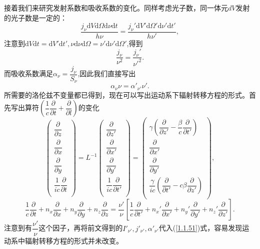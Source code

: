 \documentclass[../天体物理基础.tex]{subfiles}
\begin{document}
接着我们来研究发射系数和吸收系数的变化。同样考虑光子数，同一体元$dV$发射的光子数是一定的：
\begin{equation}
\frac{j_\nu\mathrm{d}V\mathrm{d}\Omega\mathrm{d}\nu\mathrm{d}t}{h\nu}=\frac{j_\nu'\mathrm{d}V'\mathrm{d}\Omega'\mathrm{d}\nu'\mathrm{d}t'}{h\nu'},
\end{equation}
注意到$\mathrm{d}V\mathrm{d}t=\mathrm{d}V'\mathrm{d}t',\nu\mathrm{d}\nu\mathrm{d}\Omega=\nu'\mathrm{d}\nu'\mathrm{d}\Omega'$,得到
\begin{equation}
\frac{j_\nu}{\nu^2}=\frac{j_\nu'}{\nu'^2}.
\end{equation}
而吸收系数满足$\alpha_{\nu}=\dfrac{j_{\nu}}{S_{\nu}}$,因此我们直接写出
\begin{equation}
\alpha_{\nu}\nu=\alpha'_{\nu'}\nu'.
\end{equation}
所需要的洛伦兹不变量都已得到，现在可以写出运动系下辐射转移方程的形式。首先写出算符$\left(\dfrac{1}{c}\dfrac{\partial{}}{\partial{}t}+\dfrac{\partial{}}{\partial{}l}\right)$的变化
\begin{equation}
\begin{pmatrix}
\dfrac{\partial}{\partial z}\\
\dfrac{\partial}{\partial x}\\
\dfrac{\partial}{\partial y}\\
\dfrac1{ic}\dfrac{\partial}{\partial t}\\
\end{pmatrix}
=L^{-1}
\begin{pmatrix}
\dfrac{\partial}{\partial z'}\\
\dfrac{\partial}{\partial x'}\\
\dfrac{\partial}{\partial y'}\\
\dfrac1{ic}\dfrac{\partial}{\partial t'}\\
\end{pmatrix}
=\begin{pmatrix}
\gamma(\dfrac{\partial}{\partial z'}-\dfrac{\beta}c\dfrac{\partial}{\partial t'})\\
\dfrac{\partial}{\partial x'}\\
\dfrac{\partial}{\partial y'}\\
\dfrac\gamma{ic}(\dfrac{\partial}{\partial t'}-c\beta\dfrac{\partial}{\partial z'})\\
\end{pmatrix},
\end{equation}
\begin{equation}
\frac1c\frac{\partial }{\partial t}+n_{x}\frac{\partial}{\partial x}+n_{y}\frac{\partial}{\partial y}+n_{z}\frac{\partial}{\partial z}=\frac{\nu'}{\nu}[\frac1c\frac{\partial}{\partial t'}+n_{x}'\frac{\partial}{\partial x'}+n_{y}'\frac{\partial}{\partial y'}+n_{z}'\frac{\partial}{\partial z'}].
\end{equation}
注意到有$\dfrac{\nu'}{\nu}$这个因子，再将前文得到的$I'_{\nu'},j'_{\nu'},\alpha'_{\nu'}$代入(\ref{1.1.51})式，容易发现运动系中辐射转移方程的形式并未改变。
\end{document}
